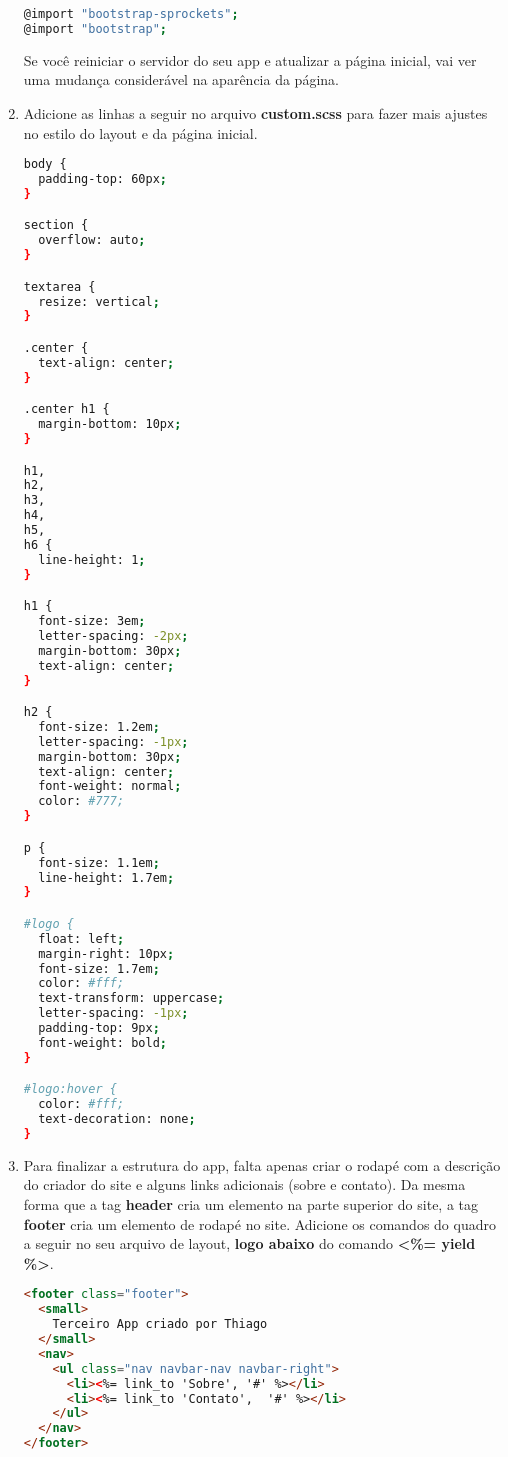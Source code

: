 \documentclass[a4paper,12pt]{article}
\begin{document}
\begin{enumerate}
  \begin{lstlisting}[language=Bash, title={app/assets/stylesheets/custom.scss}]
@import "bootstrap-sprockets";
@import "bootstrap";
  \end{lstlisting}

  Se você reiniciar o servidor do seu app e atualizar a página inicial, vai ver uma mudança considerável na aparência da página.

  \item Adicione as linhas a seguir no arquivo \textbf{custom.scss} para fazer mais ajustes no estilo do layout e da página inicial.

  \begin{lstlisting}[language=Bash, title={app/assets/stylesheets/custom.scss}]
body {
  padding-top: 60px;
}

section {
  overflow: auto;
}

textarea {
  resize: vertical;
}

.center {
  text-align: center;
}

.center h1 {
  margin-bottom: 10px;
}

h1,
h2,
h3,
h4,
h5,
h6 {
  line-height: 1;
}

h1 {
  font-size: 3em;
  letter-spacing: -2px;
  margin-bottom: 30px;
  text-align: center;
}

h2 {
  font-size: 1.2em;
  letter-spacing: -1px;
  margin-bottom: 30px;
  text-align: center;
  font-weight: normal;
  color: #777;
}

p {
  font-size: 1.1em;
  line-height: 1.7em;
}

#logo {
  float: left;
  margin-right: 10px;
  font-size: 1.7em;
  color: #fff;
  text-transform: uppercase;
  letter-spacing: -1px;
  padding-top: 9px;
  font-weight: bold;
}

#logo:hover {
  color: #fff;
  text-decoration: none;
}
  \end{lstlisting}

  \item Para finalizar a estrutura do app, falta apenas criar o rodapé com a descrição do criador do site e alguns links adicionais (sobre e contato). Da mesma forma que a tag \textbf{header} cria um elemento na parte superior do site, a tag \textbf{footer} cria um elemento de rodapé no site. Adicione os comandos do quadro a seguir no seu arquivo de layout, \textbf{logo abaixo} do comando \textbf{<\%= yield \%>}.

  \pagebreak

  \begin{lstlisting}[language=html, title={app/views/layouts/application.html.erb}, basicstyle=\scriptsize]
<footer class="footer">
  <small>
    Terceiro App criado por Thiago
  </small>
  <nav>
    <ul class="nav navbar-nav navbar-right">
      <li><%= link_to 'Sobre', '#' %></li>
      <li><%= link_to 'Contato',  '#' %></li>
    </ul>
  </nav>
</footer>
  \end{lstlisting}


\end{enumerate}
\end{document}
